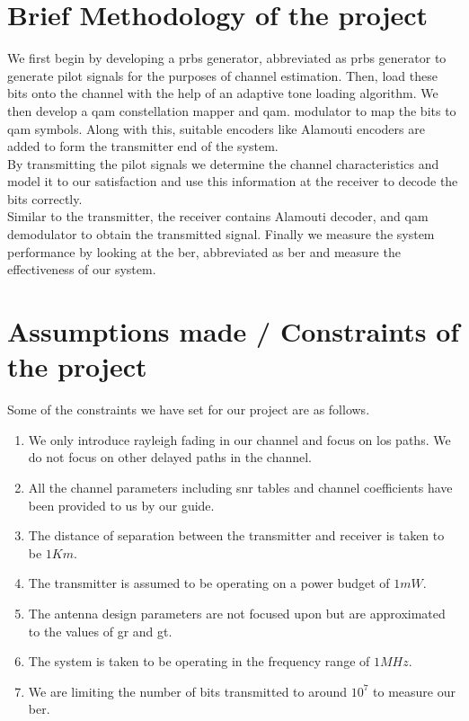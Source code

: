 \section{Brief Methodology of the project}
We first begin by developing a \acrlong{prbs} generator, abbreviated as \acrshort{prbs} generator to generate \glspl{pilot signal} for the purposes of channel estimation. Then, load these bits onto the channel with the help of an adaptive tone loading algorithm. We then develop a \acrshort{qam} constellation mapper and \acrshort{qam}. modulator to map the bits to \acrshort{qam} symbols. Along with this, suitable encoders like Alamouti encoders are added to form the transmitter end of the system.\\
By transmitting the \glspl{pilot signal} we determine the channel characteristics and model it to our satisfaction and use this information at the receiver to decode the bits correctly.\\
Similar to the transmitter, the receiver contains Alamouti decoder, and \acrshort{qam} demodulator to obtain the transmitted signal. Finally we measure the system performance by looking at the \acrlong{ber}, abbreviated as \acrshort{ber} and measure the effectiveness of our system.

\section{Assumptions made / Constraints of the project}
Some of the constraints we have set for our project are as follows.
\begin{enumerate}
\item We only introduce \gls{rayleigh fading} in our channel and focus on \acrshort{los} paths. We do not focus on other delayed paths in the channel.
\item All the channel parameters including \acrshort{snr} tables and channel coefficients have been provided to us by our guide.
\item The distance of separation between the transmitter and receiver is taken to be $1Km$.
\item The transmitter is assumed to be operating on a power budget of $1mW$.
\item The antenna design parameters are not focused upon but are approximated to the values of \acrshort{gr} and \acrshort{gt}.
\item The system is taken to be operating in the frequency range of $1 MHz$.
\item We are limiting the number of bits transmitted to around $10^7$ to measure our \acrshort{ber}.
\end{enumerate}

